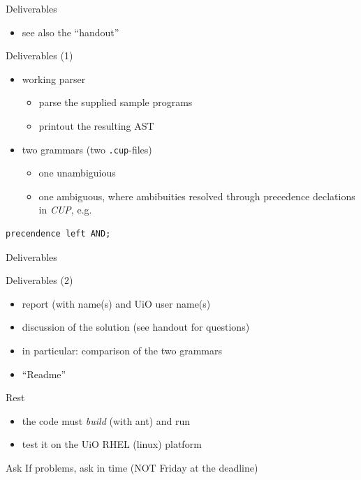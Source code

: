 \documentclass{beamer}
\begin{document}
\begin{frame}[label={sec:org6c07a71},fragile]{Deliverables}
 \begin{itemize}
\item see also the ``handout''
\end{itemize}

\begin{block}{Deliverables (1)}
\begin{itemize}
\item working \alert{parser}
\begin{itemize}
\item parse the supplied sample programs
\item printout the resulting AST
\end{itemize}

\item \alert{two} grammars (two \texttt{.cup}-files)

\begin{itemize}
\item one unambiguious
\item one ambiguous, where ambibuities resolved through precedence
declations in \emph{CUP}, e.g.
\end{itemize}
\end{itemize}

\begin{verbatim}
precendence left AND;
\end{verbatim}
\end{block}
\end{frame}


\begin{frame}[label={sec:org14e841f}]{Deliverables}
\begin{block}{Deliverables (2)}
\begin{itemize}
\item report (with name(s) and UiO user name(s)
\item discussion of the solution (see handout for questions)
\item in particular: comparison of the two grammars
\item ``Readme''
\end{itemize}
\end{block}

\begin{block}{Rest}
\begin{itemize}
\item the code must \emph{build} (with ant) and run
\item test it on the  UiO RHEL (linux) platform
\end{itemize}
\end{block}

\begin{block}{Ask}
If problems, \alert{ask in time}  (\alert{NOT} Friday at the deadline)
\end{block}
\end{frame}
\end{document}
